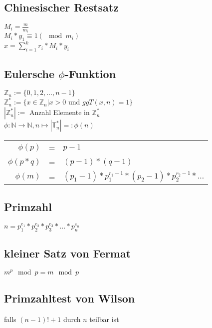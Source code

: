 \subsection{Chinesischer Restsatz}
$M_i = \frac{m}{m_i}$ \\
$M_i * y_1 \equiv 1 (\mod m_i)$ \\
$x = \sum_{i=1}^{k} r_i * M_i * y_i$

\subsection{Eulersche $\phi$-Funktion}
$\mathbb{Z}_n := \{ 0, 1, 2, \ldots, n-1\} $ \\
$\mathbb{Z}_n^* := \{ x \in \mathbb{Z}_n | x > 0 $ und $ ggT(x,n) = 1 \} $ \\
$|\mathbb{Z}_n^*| := $ Anzahl Elemente in $\mathbb{Z}_n^*$ \\

$\phi : \mathbb{N} \rightarrow \mathbb{N}, n \mapsto |\mathbb{T}_n^*| =: \phi (n) $ \\

\begin{tabular}{rcl}
    $\phi (p)$ & = & $p - 1$ \\
    $\phi (p * q)$ & = & $(p - 1) * (q - 1)$ \\
    $\phi (m)$ & = & $(p_1 - 1) * p_1^{r_1 - 1} * (p_2 - 1) * p_2^{r_2 - 1} * \ldots $ \\
\end{tabular}

\subsection{Primzahl}
$ n = p_1^{e_1} * p_2^{e_2} * p_3^{e_3} * \ldots *  p_n^{e_n} $

\subsection{kleiner Satz von Fermat}
$m^p \mod p = m \mod p$

\subsection{Primzahltest von Wilson}
falls $(n - 1)! + 1$ durch $n$ teilbar ist

